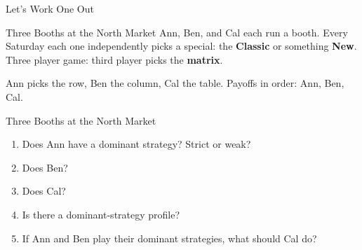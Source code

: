 
\begin{frame}[standout]
Let's Work One Out
\end{frame}

\begin{frame}{Three Booths at the North Market}
Ann, Ben, and Cal each run a booth. Every Saturday each one independently picks
a special: the \textbf{Classic} or something \textbf{New}.\\
Three player game: third player picks the \textbf{matrix}.
\bsk
\centering
{\small
\begin{matrixgame}[top={Classic, New}, left={Classic, New}, bottom={Cal: Classic, Cal: New}, player names={Ann, Ben, Cal}]
\end{matrixgame}}
\bsk
\raggedright
{\footnotesize Ann picks the row, Ben the column, Cal the table. Payoffs in order:
Ann, Ben, Cal.}
\vspace{-0.2in}
\end{frame}

\begin{frame}{Three Booths at the North Market}
\begin{enumerate}
    \item Does Ann have a dominant strategy? Strict or weak? \vspace{0.3in}
    \item Does Ben? \vspace{0.3in}
    \item Does Cal? \vspace{0.3in}
    \item Is there a dominant-strategy profile? \vspace{0.3in}
    \item If Ann and Ben play their dominant strategies, what should Cal do? \vspace{0.3in}
\end{enumerate}
\end{frame}

